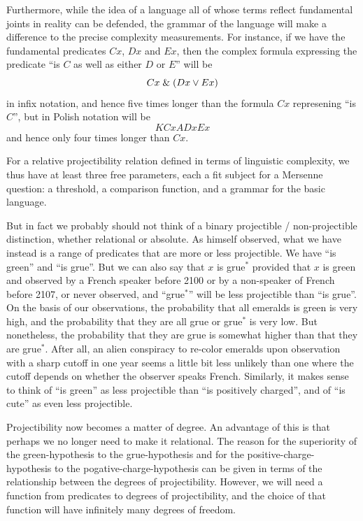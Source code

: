 Furthermore, while the idea of a language all of whose terms reflect fundamental joints in reality can be defended, the grammar
of the language will make a difference to the precise complexity measurements. For instance, if we have the fundamental predicates 
$Cx$, $Dx$ and $Ex$, then the complex formula expressing the predicate ``is $C$ as well as either $D$ or $E$'' will be 
$$
    Cx \mathrel{\&} (Dx \vee Ex)
$$    
    in infix notation, and hence five times longer than the formula $Cx$ represening ``is $C$'', but in Polish notation 
    will be 
$$
    KCxADxEx
$$    
and hence only four times longer than $Cx$.

For a relative projectibility relation defined in terms of linguistic complexity, we thus have at least three free parameters,
each a fit subject for a Mersenne question: a threshold, a comparison function, and a grammar for the basic language.

But in fact we probably should not think of a binary projectible / non-projectible distinction, whether
relational or absolute. As  himself observed, what we 
have instead is a range of predicates that are more or less projectible. We have ``is green'' and
``is grue''. But we can also say that $x$ is grue$^*$ provided that $x$ is green and observed by a French speaker before 2100 or by a 
non-speaker of French before 2107, or never observed, and ``grue$^*$'' will be less projectible than ``is grue''. On the basis of our observations, the
probability that all emeralds is green is very high, and the probability that they are all grue or grue$^*$ is very low. But
nonetheless, the probability that they are grue is somewhat higher than that they are grue$^*$. After all, an alien conspiracy to
re-color emeralds upon observation with a sharp cutoff in one year seems a little bit less unlikely than one where the cutoff 
depends on whether the observer speaks French. Similarly, it makes sense to think of ``is green'' as less projectible than ``is positively
charged'', and of ``is cute'' as even less projectible. 

Projectibility now becomes a matter of degree. An advantage of this is that perhaps we no longer need to make it relational.
The reason for the superiority of the green-hypothesis to the grue-hypothesis and for the positive-charge-hypothesis to the
pogative-charge-hypothesis can be given in terms of the relationship between the degrees of projectibility. However, 
we will need a function from predicates to degrees of projectibility, and the choice of that function will have infinitely
many degrees of freedom.

